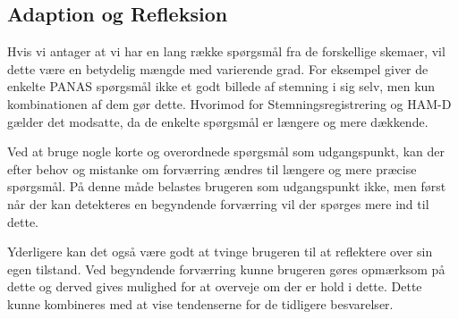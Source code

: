 \subsection{Adaption og Refleksion}
Hvis vi antager at vi har en lang række spørgsmål fra de forskellige skemaer, vil dette være en betydelig mængde med varierende grad.
For eksempel giver de enkelte PANAS spørgsmål ikke et godt billede af stemning i sig selv, men kun kombinationen af dem gør dette.
Hvorimod for Stemningsregistrering og HAM-D gælder det modsatte, da de enkelte spørgsmål er længere og mere dækkende.

Ved at bruge nogle korte og overordnede spørgsmål som udgangspunkt, kan der efter behov og mistanke om forværring ændres til længere og mere præcise spørgsmål.
På denne måde belastes brugeren som udgangspunkt ikke, men først når der kan detekteres en begyndende forværring vil der spørges mere ind til dette.

Yderligere kan det også være godt at tvinge brugeren til at reflektere over sin egen tilstand.
Ved begyndende forværring kunne brugeren gøres opmærksom på dette og derved gives mulighed for at overveje om der er hold i dette.
Dette kunne kombineres med at vise tendenserne for de tidligere besvarelser.
